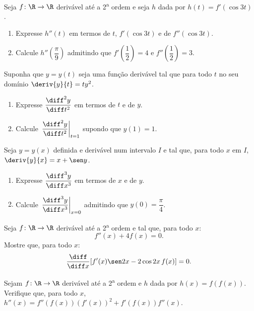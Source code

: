 \begin{exercicio}[27]
Seja $f\colon \R \to \R$ derivável até a 2\textsuperscript{a} ordem e seja $h$ dada por $h(t) = f'(\cos 3t)$.
\begin{enumerate}[label=\alph*)]
    \item Expresse $h''(t)$ em termos de $t$, $f'(\cos 3t)$ e de $f''(\cos 3t)$.
    \item Calcule $h''\!\left(\dfrac{\pi}{9}\right)$ admitindo que $f'\!\left(\dfrac{1}{2}\right) = 4$ e $f''\!\left(\dfrac{1}{2}\right) = 3$.
\end{enumerate}
\end{exercicio}

\begin{exercicio}[28]
Suponha que $y = y(t)$ seja uma função derivável tal que para todo $t$ no seu domínio $\deriv{y}{t} = ty^2$.
\begin{enumerate}[label=\alph*)]
    \item Expresse $\dfrac{\diff^2 y}{\diff t^2}$ em termos de $t$ e de $y$.
    \item Calcule $\left.\dfrac{\diff^2 y}{\diff t^2}\right|_{t = 1}$ supondo que $y(1) = 1$.
\end{enumerate}
\end{exercicio}

\begin{exercicio}[29]
Seja $y = y(x)$ definida e derivável num intervalo $I$ e tal que, para todo $x$ em $I$, $\deriv{y}{x} = x + \sen y$.
\begin{enumerate}[label=\alph*)]
    \item Expresse $\dfrac{\diff^3 y}{\diff x^3}$ em termos de $x$ e de $y$.
    \item Calcule $\left.\dfrac{\diff^3 y}{\diff x^3}\right|_{x = 0}$ admitindo que $y(0) = \dfrac{\pi}{4}$.
\end{enumerate}
\end{exercicio}

\begin{exercicio}[30]
Seja $f\colon \R \to \R$ derivável até a 2\textsuperscript{a} ordem e tal que, para todo $x$:
\[
f''(x) + 4f(x) = 0.
\]
Mostre que, para todo $x$:
\[
\frac{\diff}{\diff x}[f'(x)\sen 2x - 2\cos 2x\,f(x)] = 0.
\]
\end{exercicio}

\begin{exercicio}[31]
Sejam $f\colon \R \to \R$ derivável até a 2\textsuperscript{a} ordem e $h$ dada por $h(x) = f(f(x))$. Verifique que, para todo $x$, $h''(x) = f''(f(x))(f'(x))^2 + f'(f(x))f''(x)$.
\end{exercicio}

